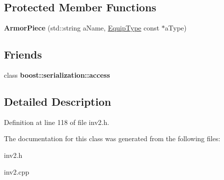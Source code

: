 \subsection*{Protected Member Functions}
\begin{DoxyCompactItemize}
\item 
\hypertarget{class_armor_piece_a7149ebcb6c3cc80666f122981fe460c5}{}\label{class_armor_piece_a7149ebcb6c3cc80666f122981fe460c5} 
{\bfseries Armor\+Piece} (std\+::string a\+Name, \hyperlink{class_equip_type}{Equip\+Type} const $\ast$a\+Type)
\end{DoxyCompactItemize}
\subsection*{Friends}
\begin{DoxyCompactItemize}
\item 
\hypertarget{class_armor_piece_ac98d07dd8f7b70e16ccb9a01abf56b9c}{}\label{class_armor_piece_ac98d07dd8f7b70e16ccb9a01abf56b9c} 
class {\bfseries boost\+::serialization\+::access}
\end{DoxyCompactItemize}


\subsection{Detailed Description}


Definition at line 118 of file inv2.\+h.



The documentation for this class was generated from the following files\+:\begin{DoxyCompactItemize}
\item 
inv2.\+h\item 
inv2.\+cpp\end{DoxyCompactItemize}
